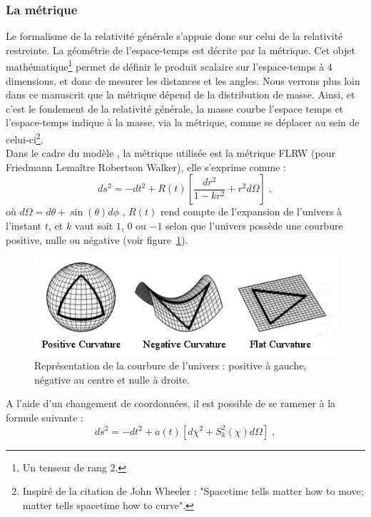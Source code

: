 \documentclass[11pt, twoside, a4paper, openright]{report}
\begin{document}
\subsubsection{La métrique}
Le formalisme de la relativité générale s'appuie donc sur celui de la relativité restreinte. La géométrie de l'espace-temps est décrite par la métrique. Cet objet mathématique\footnote{Un tenseur de rang 2.} permet de définir le produit scalaire sur l'espace-temps à 4 dimensions, et donc de mesurer les distances et les angles.
Nous verrons plus loin dans ce manuscrit que la métrique dépend de la distribution de masse. Ainsi, et c'est le fondement de la relativité générale, la masse courbe l'espace temps et l'espace-temps indique à la masse, via la métrique, comme se déplacer au sein de celui-ci\footnote{Inspiré de la citation de John Wheeler : "Spacetime tells matter how to move; matter tells spacetime how to curve".}. \\
Dans le cadre du modèle \lcdm{}, la métrique utilisée est la métrique FLRW (pour Friedmann Lemaître Robertson Walker), elle s'exprime comme :
\begin{equation}
  \label{eq:metrique1}
  ds^2 = - dt^2 + R(t) \left[ \frac{dr^2}{1 - k r^2} + r^2 d\Omega \right] \; ,
\end{equation}
où $d\Omega = d\theta + \sin(\theta) d\phi$ , $R(t)$ rend compte de l'expansion de l'univers à l'instant $t$, et $k$ vaut soit $1$, $0$ ou $-1$ selon que l'univers possède une courbure positive, nulle ou négative (voir figure~\ref{fig:curvature}).
\begin{figure}
  \centering
  \includegraphics[scale=0.6]{curvature}
  \caption{Représentation de la courbure de l'univers : positive à gauche, négative au centre et nulle à droite.}
  \label{fig:curvature}
\end{figure}
A l'aide d'un changement de coordonnées, il est possible de se ramener à la formule suivante :
\begin{equation}
  \label{eq:metrique2}
  ds^2 = - dt^2 + a(t)\left[ d\chi^2 + S_{k}^2(\chi) d\Omega \right] \; ,
\end{equation}
\end{document}
